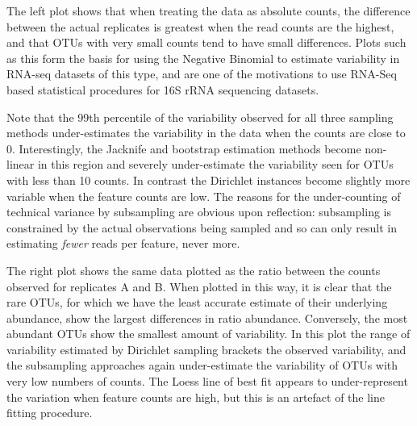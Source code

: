 \documentclass[11pt]{article}\usepackage[]{graphicx}\usepackage[]{color}
\begin{document}
The left plot shows that when treating the data as absolute counts, the difference between the actual replicates is greatest when the read counts are the highest, and that OTUs with very small counts tend to have small differences. Plots such as this form the basis for using the Negative Binomial to estimate variability in RNA-seq datasets of this type, and are one of the motivations to use RNA-Seq based statistical procedures for 16S rRNA sequencing datasets\cite{McMurdie:2014a}.  

Note that the 99th percentile of the variability observed for all three sampling methods under-estimates the variability in the data when the counts are close to 0. Interestingly, the Jacknife and bootstrap estimation methods become non-linear in this region and severely under-estimate the variability seen for OTUs with less than 10 counts. In contrast the Dirichlet instances become slightly more variable when the feature counts are low. The reasons for the under-counting of technical variance by subsampling are obvious upon reflection: subsampling is constrained by the actual observations being sampled and so can only result in estimating \emph{fewer} reads per feature, never more.  

The right plot shows the same data plotted as the ratio between the counts observed for replicates A and B. When plotted in this way, it is clear that the rare OTUs, for which we have the least accurate estimate of their underlying abundance, show the largest  differences in ratio abundance. Conversely, the most abundant OTUs show the smallest amount of  variability. In this plot the range of variability estimated by Dirichlet sampling brackets the observed variability, and the subsampling approaches again under-estimate the variability of OTUs with very low numbers of counts. The Loess line of best fit appears to under-represent the variation when feature counts are high, but this is an artefact of the line fitting procedure.

 
\end{document}
